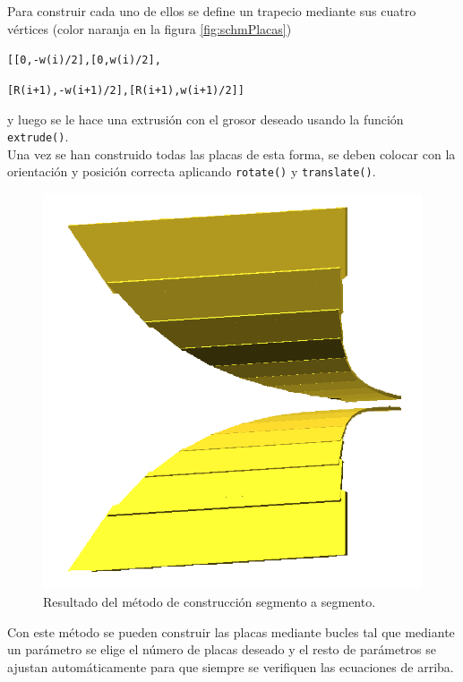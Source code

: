 \documentclass[11pt,a4paper,twoside,pdf]{article}
\numberwithin{equation}{section}
\begin{document}
Para construir cada uno de ellos se define un trapecio mediante sus cuatro vértices (color naranja en la figura \ref{fig:schmPlacas})

    \texttt{[[0,-w(i)/2],\hspace{1.55cm}[0,w(i)/2],}
    
    \texttt{[R(i+1),-w(i+1)/2],\hspace{0.2cm}[R(i+1),w(i+1)/2]]}
    
\noindent y luego se le hace una extrusión con el grosor deseado usando la función \texttt{extrude()}.\\

Una vez se han construido todas las placas de esta forma, se deben colocar con la orientación y posición correcta aplicando \texttt{rotate()} y \texttt{translate()}.\\

\begin{figure}
    \vspace{-0.4cm}
    \includegraphics[width=\linewidth]{img/modelos/2025_02_20-Placas/picosPlacas.png}
    \caption{Resultado del método de construcción segmento a segmento.}
    \label{fig:segmentos}
\end{figure}
Con este método se pueden construir las placas mediante bucles tal que mediante un parámetro se elige el número de placas deseado y el resto de parámetros se ajustan automáticamente para que siempre se verifiquen las ecuaciones de arriba. 
\end{document}
